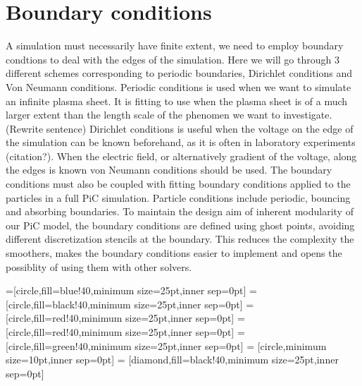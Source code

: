 \section{Boundary conditions}
	A simulation must necessarily have finite extent, we need to employ boundary condtions
	to deal with the edges of the simulation. Here we will go through \(3\) different schemes
	corresponding to periodic boundaries, Dirichlet conditions and Von Neumann conditions.
	Periodic conditions is used when we want to simulate an infinite plasma sheet.
	It is fitting to use when the plasma sheet is of a much larger extent than the
	length scale of the phenomen we want to investigate. (Rewrite sentence)
	Dirichlet conditions is useful when the voltage on the edge of the simulation
	can be known beforehand, as it is often in laboratory experiments (citation?).
	When the electric field, or alternatively gradient of the voltage, along the edges is known
	von Neumann conditions should be used. The boundary conditions must also be coupled
	with fitting boundary conditions applied to the particles in a full PiC simulation.
	Particle conditions include periodic, bouncing and absorbing boundaries.
	To maintain the design aim of inherent modularity of our PiC model, the boundary conditions
	are defined using ghost points, avoiding different discretization stencils at
	the boundary. This reduces the complexity the smoothers, makes the boundary
	conditions easier to implement and opens the possiblity of using them with other
	solvers.

	=[circle,fill=blue!40,minimum size=25pt,inner sep=0pt]
	=[circle,fill=black!40,minimum size=25pt,inner sep=0pt]
	 = [circle,fill=red!40,minimum size=25pt,inner sep=0pt]
	 = [circle,fill=red!40,minimum size=25pt,inner sep=0pt]
	 = [circle,fill=green!40,minimum size=25pt,inner sep=0pt]
	 = [circle,minimum size=10pt,inner sep=0pt]
	 = [diamond,fill=black!40,minimum size=25pt,inner sep=0pt]

